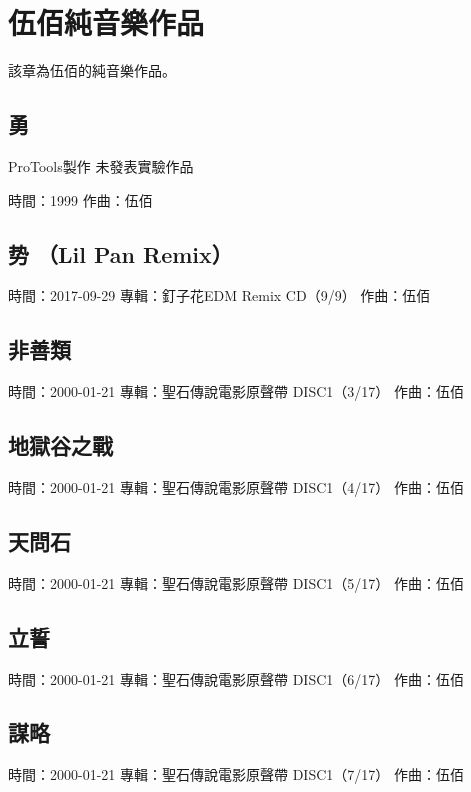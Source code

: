 \documentclass[UTF8,a4paper,oneside,twocolumn,12pt]{ctexbook}
\newcommand{\infopair}[2]{\textbullet #1：#2}
\newcommand{\zq}[1][伍佰]{\infopair{作曲}{#1}}
\newcommand{\zj}[1]{\infopair{專輯}{#1}}
\newcommand{\sj}[1]{\infopair{時間}{#1}}
\newenvironment{info}{\begin{flushleft}\kaishu
	}
	{\end{flushleft}\normalsize\yahei\par}
\begin{document}
\chapter{伍佰純音樂作品}
該章為伍佰的純音樂作品。

\section{勇}
\begin{info}
	ProTools製作 未發表實驗作品

	\sj{1999}
	\zq
\end{info}

\section{势 （Lil Pan Remix）}
\begin{info}
	\sj{2017-09-29}
	\zj{釘子花EDM Remix CD（9/9）}
	\zq
\end{info}

\section{非善類}
\begin{info}
	\sj{2000-01-21}
	\zj{聖石傳說電影原聲帶 DISC1（3/17）}
	\zq
\end{info}

\section{地獄谷之戰}
\begin{info}
	\sj{2000-01-21}
	\zj{聖石傳說電影原聲帶 DISC1（4/17）}
	\zq
\end{info}

\section{天問石}
\begin{info}
	\sj{2000-01-21}
	\zj{聖石傳說電影原聲帶 DISC1（5/17）}
	\zq
\end{info}

\section{立誓}
\begin{info}
	\sj{2000-01-21}
	\zj{聖石傳說電影原聲帶 DISC1（6/17）}
	\zq
\end{info}

\section{謀略}
\begin{info}
	\sj{2000-01-21}
	\zj{聖石傳說電影原聲帶 DISC1（7/17）}
	\zq
\end{info}
\end{document}
